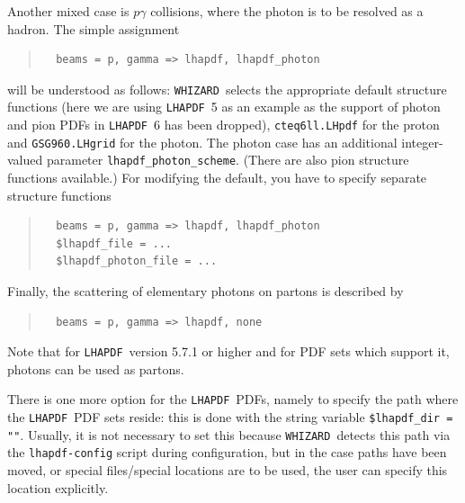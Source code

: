 \documentclass[12pt]{book}
\newcommand{\ttt}[1]{\texttt{#1}}
\newcommand{\whizard}{\ttt{WHIZARD}}
\newcommand{\lhapdf}{\ttt{LHAPDF}}
\begin{document}
Another mixed case is $p\gamma$ collisions, where the photon is to be
resolved as a hadron.  The simple assignment
\begin{quote}
\begin{footnotesize}
\begin{verbatim}
  beams = p, gamma => lhapdf, lhapdf_photon
\end{verbatim}
\end{footnotesize}
\end{quote}
will be understood as follows: \whizard\ selects the appropriate default
structure functions (here we are using \lhapdf\ 5 as an example as the
support of photon and pion PDFs in \lhapdf\ 6 has been dropped),
\ttt{cteq6ll.LHpdf} for the proton and
\ttt{GSG960.LHgrid} for the photon.  The photon case has an additional
integer-valued parameter \verb|lhapdf_photon_scheme|.  (There are also pion
structure functions available.)  For modifying the default, you have to
specify separate structure functions
\begin{quote}
\begin{footnotesize}
\begin{verbatim}
  beams = p, gamma => lhapdf, lhapdf_photon
  $lhapdf_file = ...
  $lhapdf_photon_file = ...
\end{verbatim}
\end{footnotesize}
\end{quote}
Finally, the scattering of elementary photons on partons is described by
\begin{quote}
\begin{footnotesize}
\begin{verbatim}
  beams = p, gamma => lhapdf, none
\end{verbatim}
\end{footnotesize}
\end{quote}

Note that for \lhapdf\ version 5.7.1 or higher and for PDF sets which
support it, photons can be used as partons.

There is one more option for the \lhapdf\ PDFs, namely to specify the
path where the \lhapdf\ PDF sets reside: this is done with the string
variable \ttt{\$lhapdf\_dir = "{\em <path-to-lhapdf>}"}. Usually, it
is not necessary to set this because \whizard\ detects this path via
the \ttt{lhapdf-config} script during configuration, but in the case
paths have been moved, or special files/special locations are to be
used, the user can specify this location explicitly.

\end{document}
